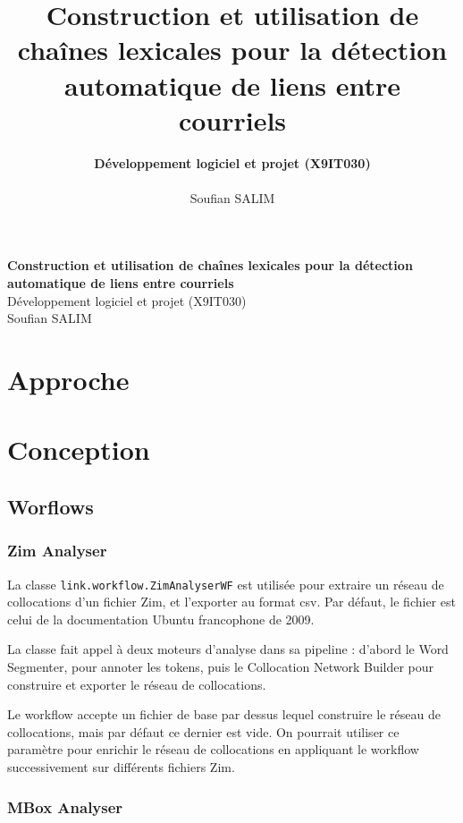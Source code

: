 \documentclass[a4paper]{article}
\title{\bf Construction et utilisation de chaînes lexicales pour la détection automatique de liens entre courriels}
\author{
    \textbf{Développement logiciel et projet (X9IT030)} \\
    \\
    Soufian SALIM
}
\begin{document}
\begin{titlepage}
	\vspace*{\fill}
	
	\begin{center}
		{\Large \bf Construction et utilisation de chaînes lexicales pour la détection automatique de liens entre courriels}\\[0.8cm]
		{\Large Développement logiciel et projet (X9IT030)}\\[0.8cm]
		{Soufian SALIM}\\[0.8cm]
	\end{center}
	
	\vspace*{\fill}
\end{titlepage}

\newpage

\section{Approche}

\section{Conception}

\subsection{Worflows}

\subsubsection{Zim Analyser}

La classe \texttt{link.workflow.ZimAnalyserWF} est utilisée pour extraire un réseau de collocations d'un fichier Zim, et l'exporter au format csv. Par défaut, le fichier est celui de la documentation Ubuntu francophone de 2009.

La classe fait appel à deux moteurs d'analyse dans sa pipeline : d'abord le Word Segmenter, pour annoter les tokens, puis le Collocation Network Builder pour construire et exporter le réseau de collocations.

Le workflow accepte un fichier de base par dessus lequel construire le réseau de collocations, mais par défaut ce dernier est vide. On pourrait utiliser ce paramètre pour enrichir le réseau de collocations en appliquant le workflow successivement sur différents fichiers Zim.

\subsubsection{MBox Analyser}
\end{document}
